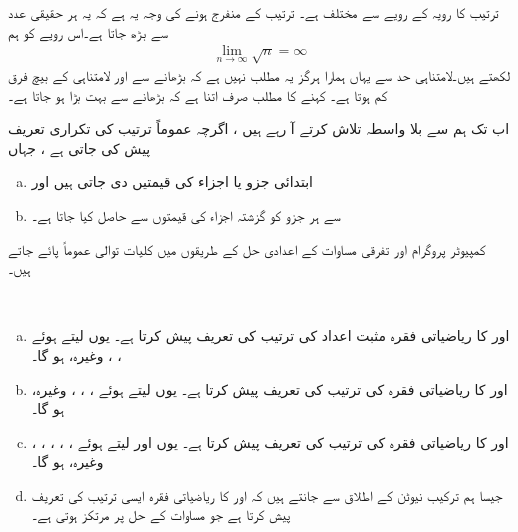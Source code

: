 ترتیب  کا رویہ  کے رویے سے مختلف ہے۔ ترتیب  کے منفرج ہونے کی وجہ یہ ہے کہ یہ ہر حقیقی عدد  سے  بڑھ جاتا ہے۔اس رویے کو ہم
\begin{align*}
\lim_{n\to\infty}\sqrt{n}=\infty
\end{align*}
لکھتے ہیں۔لامتناہی حد سے یہاں ہمارا ہرگز یہ مطلب نہیں ہے کہ  بڑھانے سے  اور لامتناہی کے بیچ فرق کم ہوتا ہے۔ کہنے کا مطلب صرف اتنا ہے کہ   بڑھانے سے  بہت بڑا ہو جاتا ہے۔ 

اب تک ہم   سے بلا واسطہ  تلاش کرتے آ رہے ہیں ، اگرچہ  عموماً ترتیب کی  تکراری تعریف  پیش کی جاتی ہے ، جہاں
\begin{enumerate}[a.]
\item
ابتدائی جزو یا اجزاء کی قیمتیں دی جاتی ہیں اور
\item
{} سے ہر جزو کو گزشتہ اجزاء کی قیمتوں سے حاصل کیا جاتا ہے۔ 
\end{enumerate}

کمپیوٹر پروگرام اور تفرقی مساوات کے اعدادی حل کے طریقوں میں کلیات  توالی عموماً پائے جاتے ہیں۔

\\
\begin{enumerate}[a.]
\item
{} اور  کا  ریاضیاتی فقرہ مثبت اعداد کی ترتیب  کی تعریف پیش کرتا ہے۔ یوں  لیتے ہوئے ، ، وغیرہ، ہو گا۔
\item
  اور  کا  ریاضیاتی فقرہ  کی ترتیب  کی تعریف پیش کرتا ہے۔ یوں  لیتے ہوئے ، ، ،  وغیرہ، ہو گا۔
\item
{}،  ، اور  کا  ریاضیاتی فقرہ  کی ترتیب   کی تعریف پیش کرتا ہے۔ یوں  اور  لیتے ہوئے ، ، ، وغیرہ، ہو گا۔
\item
جیسا ہم ترکیب نیوٹن کے اطلاق سے جانتے ہیں کہ  اور  کا  ریاضیاتی فقرہ ایسی ترتیب کی تعریف پیش کرتا ہے جو مساوات  کے حل پر مرتکز ہوتی ہے۔
\end{enumerate}


